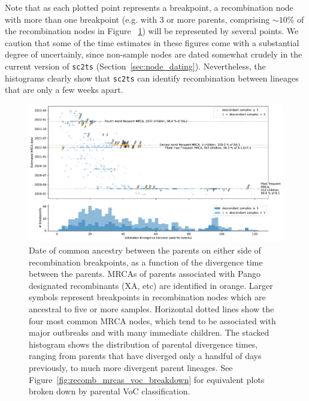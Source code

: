\documentclass{article}
\begin{document}
Note that as each plotted point represents a breakpoint, a recombination
node with more than one breakpoint (e.g. with 3 or more parents,
comprising ${\sim}10 \%$ of the
recombination nodes in Figure ~\ref{fig:recomb_mrcas}) will be represented by several points.
We caution that some of the time estimates in these figures
come with a substantial degree of uncertainly,
since non-sample nodes are dated somewhat crudely in the current version
of \texttt{sc2ts} (Section~\ref{sec:node_dating}). Nevertheless, the histograms
clearly show that \texttt{sc2ts} can identify recombination between lineages
that are only a few weeks apart.

\begin{figure} \centering
\includegraphics[width=\textwidth]{figures/recombination_node_mrcas.pdf}
\caption{\label{fig:recomb_mrcas}
Date of common ancestry between the parents on either side of recombination
breakpoints, as a function of the divergence time between the parents.
MRCAs of parents associated with Pango designated recombinants (XA, etc)
are identified in orange. Larger symbols represent breakpoints in recombination
nodes which are ancestral to five or more samples.
Horizontal dotted lines show the four most common MRCA nodes,
which tend to be associated with major outbreaks and with many immediate children.
The stacked histogram shows the distribution of parental divergence times, ranging
from parents that have diverged only a handful of days previously, to much more
divergent parent lineages. See Figure~\ref{fig:recomb_mrcas_voc_breakdown}
for equivalent plots broken down by parental VoC classification.
}
\end{figure}
\end{document}
